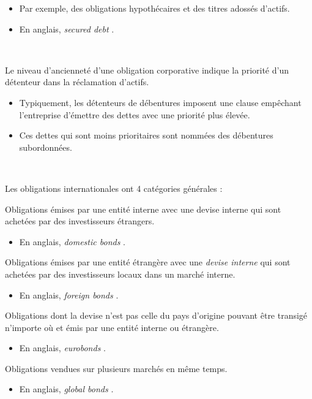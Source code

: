 \documentclass[10pt, french]{article}
\begin{document}
\begin{multicols*}{2}
\begin{definitionNOHFILLprop}
\begin{itemize}
	\item	Par exemple, des obligations hypothécaires et des titres adossés d'actifs.
	\item	En anglais, \og \textit{secured debt} \fg{}.
\end{itemize}
\end{definitionNOHFILLprop}

\

Le niveau d'ancienneté d'une obligation corporative indique la priorité d'un détenteur dans la réclamation d'actifs.
\begin{itemize}
	\item	Typiquement, les détenteurs de débentures imposent une clause empêchant l'entreprise d'émettre des dettes avec une priorité plus élevée.
	\item	Ces dettes qui sont moins prioritaires sont nommées des débentures subordonnées.
\end{itemize}

\

Les obligations internationales ont 4 catégories générales :
\begin{definitionNOHFILLprop}
Obligations émises par une entité interne avec une devise interne qui sont achetées par des investisseurs étrangers.
\begin{itemize}
	\item	En anglais, \og \textit{domestic bonds} \fg{}.
\end{itemize}
\end{definitionNOHFILLprop}

\begin{definitionNOHFILLprop}
Obligations émises par une entité étrangère avec une \textit{devise interne} qui sont achetées par des investisseurs locaux dans un marché interne.
\begin{itemize}
	\item	En anglais, \og \textit{foreign bonds} \fg{}.
\end{itemize}
\end{definitionNOHFILLprop}

\begin{definitionNOHFILLprop}
Obligations dont la devise n'est pas celle du pays d'origine pouvant être transigé n'importe où et émis par une entité interne ou étrangère.
\begin{itemize}
	\item	En anglais, \og \textit{eurobonds} \fg{}.
\end{itemize}
\end{definitionNOHFILLprop}
\begin{definitionNOHFILLprop}
Obligations vendues sur plusieurs marchés en même temps.
\begin{itemize}
	\item	En anglais, \og \textit{global bonds} \fg{}.
\end{itemize}
\end{definitionNOHFILLprop}



\end{multicols*}
\end{document}
